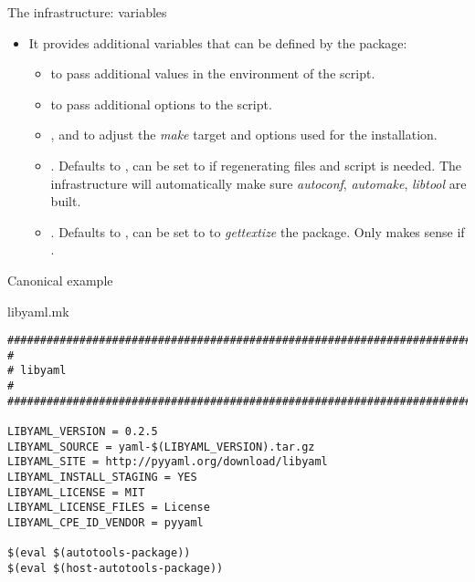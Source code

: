 \begin{frame}{The  infrastructure: variables}
  \begin{itemize}
  \item It provides additional variables that can be defined by the
    package:
    \begin{itemize}
    \item {} to pass additional values in the
      environment of the  script.
    \item {} to pass additional options to the
       script.
    \item {}, 
      and  to adjust the {\em make}
      target and options used for the installation.
    \item {}. Defaults to , can be set
      to  if regenerating  files and
       script is needed. The infrastructure will
      automatically make sure {\em autoconf}, {\em automake}, {\em
        libtool} are built.
    \item {}. Defaults to , can be set
      to  to {\em gettextize} the package. Only makes sense
      if .
    \end{itemize}
  \end{itemize}
\end{frame}

\begin{frame}[fragile]{Canonical  example}
  \begin{block}{libyaml.mk}
\begin{verbatim}
################################################################################
#
# libyaml
#
################################################################################

LIBYAML_VERSION = 0.2.5
LIBYAML_SOURCE = yaml-$(LIBYAML_VERSION).tar.gz
LIBYAML_SITE = http://pyyaml.org/download/libyaml
LIBYAML_INSTALL_STAGING = YES
LIBYAML_LICENSE = MIT
LIBYAML_LICENSE_FILES = License
LIBYAML_CPE_ID_VENDOR = pyyaml

$(eval $(autotools-package))
$(eval $(host-autotools-package))
    \end{verbatim}
  \end{block}
\end{frame}

